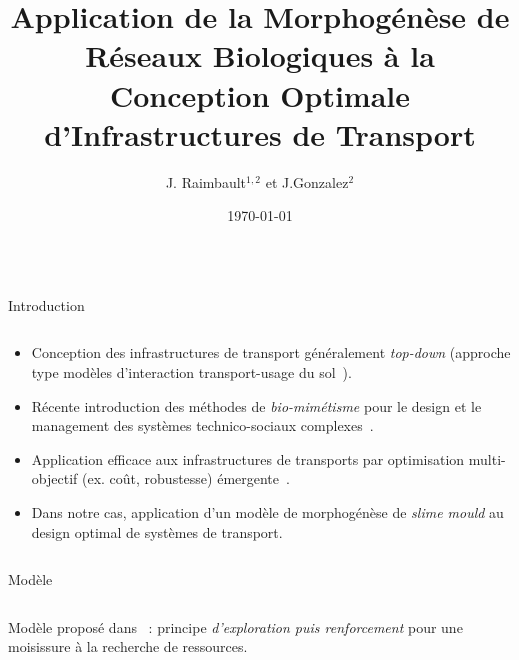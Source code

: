 \documentclass{beamer}
\title[Beamer Poster]{Application de la Morphogénèse de Réseaux Biologiques à la Conception Optimale d'Infrastructures de Transport}
\author[<juste.raimbault,jorge.gonzalez-suitt>@polytechnique.edu]{J. Raimbault$^{1,2}$ et J.Gonzalez$^{2}$}
\institute[]
  {$^1$ UMR CNRS 8504 - Géographie-Cités, $^2$ Ecole Polytechnique\vspace{1cm}}
\date{\today}
\begin{document}
  \begin{frame}{} 
  
    \vfill
    \begin{columns}[t]
      \begin{column}{.49\textwidth}
      
      
        \begin{block}{Introduction}
        \vspace{-1cm}
        \begin{columns}[t]
        \begin{column}{.95\textwidth}
          \begin{itemize}         
          \item \begin{justify}Conception des infrastructures de transport généralement \emph{top-down} (approche type modèles d'interaction transport-usage du sol~\cite{wegener2004land}).
          \end{justify}
          \bigskip
          \item \begin{justify}
          Récente introduction des méthodes de \emph{bio-mimétisme} pour le design et le management des systèmes technico-sociaux complexes~\cite{doursat2012morphogenetic}.
          \end{justify}
          \bigskip
          \item Application efficace aux infrastructures de transports par optimisation multi-objectif (ex. coût, robustesse) émergente~\cite{bebber2007biological}.
          \bigskip
          \item Dans notre cas, application d'un modèle de morphogénèse de \emph{slime mould} au design optimal de systèmes de transport.
          \end{itemize}
          \end{column}
          \end{columns}
        \end{block}
        
         \begin{block}{Modèle}
        \begin{columns}[t]
        \begin{column}{.95\textwidth}
        \vspace{-2cm}
        \begin{justify}
          Modèle proposé dans~\cite{TeroAl10} : principe \emph{d'exploration puis renforcement} pour une moisissure à la recherche de ressources.
          

\end{justify}
\end{column}
\end{columns}
\end{block}
\end{column}
\end{columns}
\end{frame}
\end{document}
